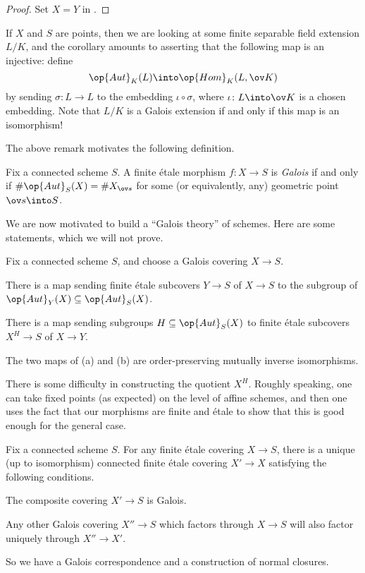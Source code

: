 \documentclass[../notes.tex]{subfiles}
\begin{document}
\begin{proof}
	Set $X=Y$ in .
\end{proof}
\begin{remark}
	If $X$ and $S$ are points, then we are looking at some finite separable field extension $L/K$, and the corollary amounts to asserting that the following map is an injective: define
	\[\op{Aut}_K(L)\into\op{Hom}_K(L,\ov K)\]
	by sending $\sigma\colon L\to L$ to the embedding $\iota\circ\sigma$, where $\iota\colon L\into\ov K$ is a chosen embedding. Note that $L/K$ is a Galois extension if and only if this map is an isomorphism!
\end{remark}
The above remark motivates the following definition.
\begin{definition}[Galois]
	Fix a connected scheme $S$. A finite \'etale morphism $f\colon X\to S$ is \textit{Galois} if and only if $\#\op{Aut}_S(X)=\#X_{\ov s}$ for some (or equivalently, any) geometric point $\ov s\into S$.
\end{definition}
We are now motivated to build a ``Galois theory'' of schemes. Here are some statements, which we will not prove.
\begin{proposition}
	Fix a connected scheme $S$, and choose a Galois covering $X\to S$.
	\begin{listalph}
		\item There is a map sending finite \'etale subcovers $Y\to S$ of $X\to S$ to the subgroup of $\op{Aut}_Y(X)\subseteq\op{Aut}_S(X)$.
		\item There is a map sending subgroups $H\subseteq\op{Aut}_S(X)$ to finite \'etale subcovers $X^H\to S$ of $X\to Y$.
		\item The two maps of (a) and (b) are order-preserving mutually inverse isomorphisms.
	\end{listalph}
\end{proposition}
\begin{remark}
	There is some difficulty in constructing the quotient $X^H$. Roughly speaking, one can take fixed points (as expected) on the level of affine schemes, and then one uses the fact that our morphisms are finite and \'etale to show that this is good enough for the general case.
\end{remark}
\begin{proposition}
	Fix a connected scheme $S$. For any finite \'etale covering $X\to S$, there is a unique (up to isomorphism) connected finite \'etale covering $X'\to X$ satisfying the following conditions.
	\begin{listroman}
		\item The composite covering $X'\to S$ is Galois.
		\item Any other Galois covering $X''\to S$ which factors through $X\to S$ will also factor uniquely through $X''\to X'$.
	\end{listroman}
\end{proposition}
So we have a Galois correspondence and a construction of normal closures.
\end{document}
